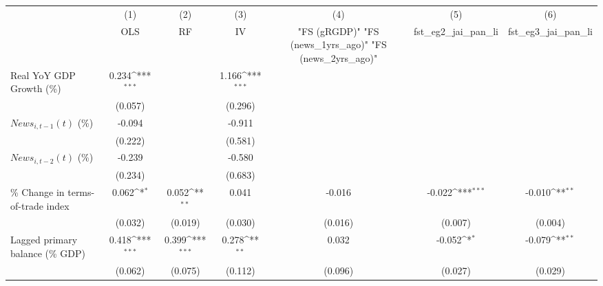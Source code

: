 {
\def\sym#1{\ifmmode^{#1}\else\(^{#1}\)\fi}
\begin{tabular}{l*{6}{c}}
\toprule
                    &\multicolumn{1}{c}{(1)}&\multicolumn{1}{c}{(2)}&\multicolumn{1}{c}{(3)}&\multicolumn{1}{c}{(4)}&\multicolumn{1}{c}{(5)}&\multicolumn{1}{c}{(6)}\\
                    &\multicolumn{1}{c}{OLS}&\multicolumn{1}{c}{RF}&\multicolumn{1}{c}{IV}&\multicolumn{1}{c}{ "FS (gRGDP)"  "FS (news_1yrs_ago)"  "FS (news_2yrs_ago)" }&\multicolumn{1}{c}{fst_eg2_jai_pan_li}&\multicolumn{1}{c}{fst_eg3_jai_pan_li}\\
\midrule
Real YoY GDP Growth (\%)&       0.234\sym{***}&                     &       1.166\sym{***}&                     &                     &                     \\
                    &     (0.057)         &                     &     (0.296)         &                     &                     &                     \\
\addlinespace
$ News_{i,t-1}(t)$ (\%)&      -0.094         &                     &      -0.911         &                     &                     &                     \\
                    &     (0.222)         &                     &     (0.581)         &                     &                     &                     \\
\addlinespace
$ News_{i,t-2}(t)$ (\%)&      -0.239         &                     &      -0.580         &                     &                     &                     \\
                    &     (0.234)         &                     &     (0.683)         &                     &                     &                     \\
\addlinespace
\% Change in terms-of-trade index&       0.062\sym{*}  &       0.052\sym{**} &       0.041         &      -0.016         &      -0.022\sym{***}&      -0.010\sym{**} \\
                    &     (0.032)         &     (0.019)         &     (0.030)         &     (0.016)         &     (0.007)         &     (0.004)         \\
\addlinespace
Lagged primary balance (\% GDP)&       0.418\sym{***}&       0.399\sym{***}&       0.278\sym{**} &       0.032         &      -0.052\sym{*}  &      -0.079\sym{**} \\
                    &     (0.062)         &     (0.075)         &     (0.112)         &     (0.096)         &     (0.027)         &     (0.029)         \\

\end{tabular}}
